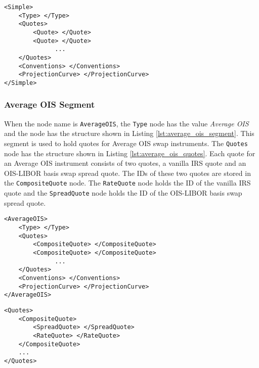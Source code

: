 {\footnotesize
\begin{lstlisting}[caption=Simple yield curve segment, label=lst:simple_segment]
<Simple>
	<Type> </Type>
	<Quotes>
		<Quote> </Quote>
		<Quote> </Quote>
		      ...
	</Quotes>
	<Conventions> </Conventions>
	<ProjectionCurve> </ProjectionCurve>
</Simple>
\end{lstlisting}
}

\subsubsection*{Average OIS Segment}
When the node name is \lstinline!AverageOIS!, the \lstinline!Type! node has the value \emph{Average OIS} and the node has 
the structure shown in Listing \ref{lst:average_ois_segment}. This segment is used to hold quotes for Average OIS swap 
instruments. The \lstinline!Quotes! node has the structure shown in Listing \ref{lst:average_ois_quotes}. Each quote for 
an Average OIS instrument consists of two quotes, a vanilla IRS quote and an OIS-LIBOR basis swap spread quote. The IDs of 
these two quotes are stored in the \lstinline!CompositeQuote! node. The \lstinline!RateQuote! node holds the ID of the  
vanilla IRS quote and the \lstinline!SpreadQuote! node holds the ID of the OIS-LIBOR basis swap spread quote.

{\footnotesize
\begin{lstlisting}[caption=Average OIS yield curve segment, label=lst:average_ois_segment]
<AverageOIS>
	<Type> </Type>
	<Quotes>
		<CompositeQuote> </CompositeQuote>
		<CompositeQuote> </CompositeQuote>
		      ...
	</Quotes>
	<Conventions> </Conventions>
	<ProjectionCurve> </ProjectionCurve>
</AverageOIS>
\end{lstlisting}
}

{\footnotesize
\begin{lstlisting}[caption=Average OIS segment's quotes section, label=lst:average_ois_quotes]
<Quotes>
	<CompositeQuote>
		<SpreadQuote> </SpreadQuote>
		<RateQuote> </RateQuote>
	</CompositeQuote>
	...
</Quotes>
\end{lstlisting}
}

